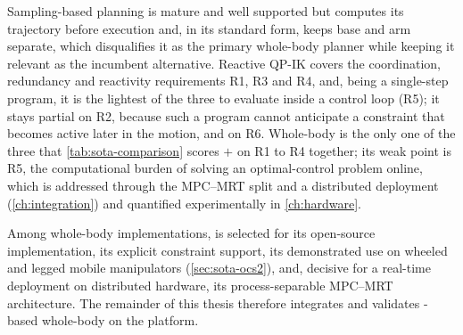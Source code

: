 Sampling-based planning is mature and well supported but computes its
trajectory before execution and, in its standard form, keeps base and
arm separate, which disqualifies it as the primary whole-body planner
while keeping it relevant as the incumbent alternative. Reactive QP-IK
covers the coordination, redundancy and reactivity requirements R1, R3
and R4, and, being a single-step program, it is the lightest of
the three to evaluate inside a control loop (R5); it stays partial on
R2, because such a program cannot anticipate a constraint that becomes
active later in the motion, and on R6. Whole-body \mpc{} is the only
one of the three that \cref{tab:sota-comparison} scores $+$ on R1 to R4
together; its weak point is R5, the
computational burden of solving an optimal-control problem online, which
is addressed through the MPC--MRT split and a distributed deployment
(\cref{ch:integration}) and quantified experimentally in
\cref{ch:hardware}.

Among whole-body \mpc{} implementations, \ocs{} is selected for its
open-source implementation, its explicit constraint support, its
demonstrated use on wheeled and legged mobile manipulators
(\cref{sec:sota-ocs2}), and, decisive for a real-time deployment on
distributed hardware, its process-separable MPC--MRT architecture. The
remainder of this thesis therefore integrates and validates \ocs{}-based
whole-body \mpc{} on the \hero{} platform.
